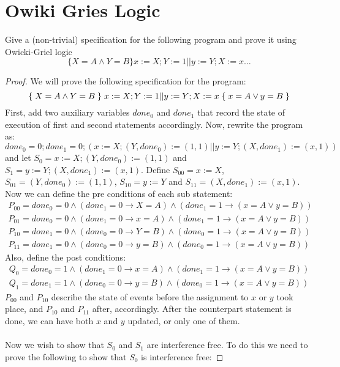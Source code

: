 \section{Owiki Gries Logic}
Give a (non-trivial) specification for the following program and prove it using Owicki-Griel logic
\begin{equation*}
	\{X=A\land Y=B\}x:=X;Y:=1 ||y :=Y; X:=x\ldots
\end{equation*}
\begin{proof}
We will prove the following specification for the program:
\begin{equation*}
	{\{\;X=A\land Y=B\;\}\;x:=X;Y:=1 || y:=Y;X:=x\;\{\;x=A\lor y=B\;\}}
\end{equation*}
First, add two auxiliary variables $done_0$ and $done_1$ that record the state of execution of first and second statements accordingly. Now, rewrite the program as:
\begin{equation*}
done_0=0;done_1=0;(x:=X;(Y,done_0):=(1,1) || y:=Y;(X,done_1):=(x,1))
\end{equation*}
and let $S_0=x:=X;(Y,done_0):=(1,1)$ and $S_1=y:=Y;(X,done_1):=(x,1)$. Define $S_{00}=x:=X$, $S_{01}=(Y,done_0):=(1,1)$, $S_{10}=y:=Y$ and $S_{11}=(X,done_1):=(x,1)$. Now we can define the pre conditions of each sub statement:
\begin{gather*}
P_{00}=done_0=0\land (done_1=0\rightarrow X=A)\land (done_1=1\rightarrow (x=A\lor y=B)) \\
P_{01}=done_0=0\land (done_1=0\rightarrow x=A)\land (done_1=1\rightarrow (x=A\lor y=B)) \\
P_{10}=done_1=0\land (done_0=0\rightarrow Y=B)\land (done_0=1\rightarrow (x=A\lor y=B)) \\
P_{11}=done_1=0\land (done_0=0\rightarrow y=B)\land (done_0=1\rightarrow (x=A\lor y=B))
\end{gather*}
Also, define the post conditions:
\begin{gather*}
Q_{0}=done_0=1\land (done_1=0\rightarrow x=A)\land (done_1=1\rightarrow (x=A\lor y=B)) \\
Q_{1}=done_1=1\land (done_0=0\rightarrow y=B)\land (done_0=1\rightarrow (x=A\lor y=B))
\end{gather*}
$P_{00}$ and $P_{10}$ describe the state of events before the assignment to $x$ or $y$ took place, and $P_{10}$ and $P_{11}$ after, accordingly. After the counterpart statement is done, we can have both $x$ and $y$ updated, or only one of them.\\ \\
Now we wish to show that $S_0$ and $S_1$ are interference free. To do this we need to prove the following to show that $S_0$ is interference free:

\end{proof}
